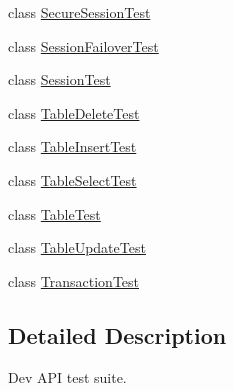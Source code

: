 \begin{DoxyCompactItemize}
\item 
class \mbox{\hyperlink{classtestsuite_1_1x_1_1devapi_1_1_secure_session_test}{Secure\+Session\+Test}}
\item 
class \mbox{\hyperlink{classtestsuite_1_1x_1_1devapi_1_1_session_failover_test}{Session\+Failover\+Test}}
\item 
class \mbox{\hyperlink{classtestsuite_1_1x_1_1devapi_1_1_session_test}{Session\+Test}}
\item 
class \mbox{\hyperlink{classtestsuite_1_1x_1_1devapi_1_1_table_delete_test}{Table\+Delete\+Test}}
\item 
class \mbox{\hyperlink{classtestsuite_1_1x_1_1devapi_1_1_table_insert_test}{Table\+Insert\+Test}}
\item 
class \mbox{\hyperlink{classtestsuite_1_1x_1_1devapi_1_1_table_select_test}{Table\+Select\+Test}}
\item 
class \mbox{\hyperlink{classtestsuite_1_1x_1_1devapi_1_1_table_test}{Table\+Test}}
\item 
class \mbox{\hyperlink{classtestsuite_1_1x_1_1devapi_1_1_table_update_test}{Table\+Update\+Test}}
\item 
class \mbox{\hyperlink{classtestsuite_1_1x_1_1devapi_1_1_transaction_test}{Transaction\+Test}}
\end{DoxyCompactItemize}


\subsection{Detailed Description}
Dev A\+PI test suite. 